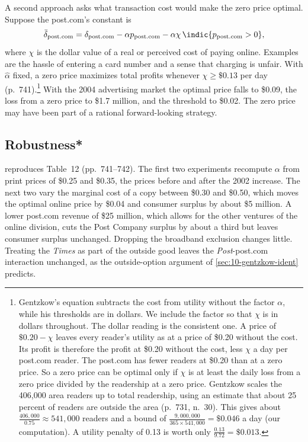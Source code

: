 A second approach asks what transaction cost would make the zero price optimal. Suppose the post.com's constant is
\begin{equation*}
  \bar\delta_{\mathrm{post.com}} = \delta_{\mathrm{post.com}} - \alpha p_{\mathrm{post.com}}
  - \alpha\chi\,\indic\{p_{\mathrm{post.com}} > 0\},
\end{equation*}
where $\chi$ is the dollar value of a real or perceived cost of paying online. Examples are the hassle of entering a
card number and a sense that charging is unfair. With $\hat\alpha$ fixed, a zero price maximizes total profits whenever
$\chi \ge \$0.13$ per day (p.~741).\footnote{Gentzkow's equation subtracts the cost from utility without the factor
$\alpha$, while his thresholds are in dollars. We include the factor so that $\chi$ is in dollars throughout. The
dollar reading is the consistent one. A price of $\$0.20 - \chi$ leaves every reader's utility as at a price of
\$0.20 without the cost. Its profit is therefore the profit at \$0.20 without the cost, less $\chi$ a day per post.com
reader. The post.com has fewer readers at \$0.20 than at a zero price. So a zero price can be optimal only if $\chi$ is
at least the daily loss from a zero price divided by the readership at a zero price. Gentzkow scales the 406,000 area
readers up to total readership, using an estimate that about 25 percent of readers are outside the area (p.~731,
n.~30). This gives about $\frac{406{,}000}{0.75} \approx 541{,}000$ readers and a bound of
$\frac{9{,}000{,}000}{365 \times 541{,}000} = \$0.046$ a day (our computation). A
utility penalty of 0.13 is worth only $\frac{0.13}{9.72} = \$0.013$.} With the 2004 advertising market the optimal price falls to \$0.09, the loss from a zero price to \$1.7
million, and the threshold to \$0.02. The zero price may have been part of a rational forward-looking strategy.

\subsection{Robustness*}\label{sec:10-gentzkow-robust}

 reproduces Table~12 (pp.~741--742). The first two experiments recompute $\alpha$ from
print prices of \$0.25 and \$0.35, the prices before and after the 2002 increase. The next two vary the marginal cost of
a copy between \$0.30 and \$0.50, which moves the optimal online price by \$0.04 and consumer surplus by about \$5
million. A lower post.com revenue of \$25 million, which allows for the other ventures of the online division, cuts the
Post Company surplus by about a third but leaves consumer surplus unchanged. Dropping the broadband exclusion changes
little. Treating the \textit{Times} as part of the outside good leaves the \textit{Post}-post.com interaction unchanged,
as the outside-option argument of \cref{sec:10-gentzkow-ident} predicts.

